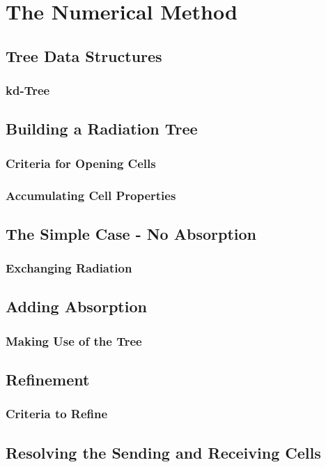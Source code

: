 \pagestyle{fancy}
\headheight 20pt
\chead{}
\lfoot{}
\cfoot{\thepage}
\rfoot{}
\renewcommand{\headrulewidth}{0.1pt}
\renewcommand{\footrulewidth}{0.1pt}

\chapter{The Numerical Method}
\label{chap:method}
\thispagestyle{fancy}



\section{Tree Data Structures}

\subsection{kd-Tree}

\section{Building a Radiation Tree}

\subsection{Criteria for Opening Cells}

\subsection{Accumulating Cell Properties}

\section{The Simple Case - No Absorption}

\subsection{Exchanging Radiation}

\section{Adding Absorption}

\subsection{Making Use of the Tree}

\section{Refinement}

\subsection{Criteria to Refine}

\section{Resolving the Sending and Receiving Cells}
